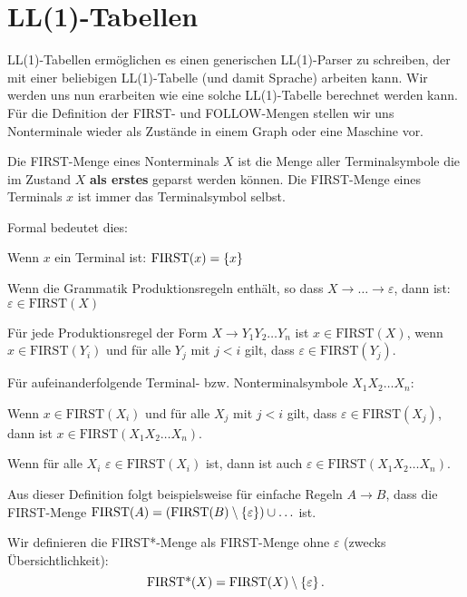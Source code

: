 \section{LL(1)-Tabellen}
LL(1)-Tabellen ermöglichen es einen generischen LL(1)-Parser zu schreiben, der mit
einer beliebigen LL(1)-Tabelle (und damit Sprache) arbeiten kann. Wir werden uns nun erarbeiten wie eine solche LL(1)-Tabelle berechnet werden kann.
Für die Definition der FIRST- und FOLLOW-Mengen stellen wir uns Nonterminale wieder
als Zustände in einem Graph oder eine Maschine vor.
\begin{defn}
Die FIRST-Menge eines Nonterminals $X$ ist die Menge aller Terminalsymbole die im Zustand $X$ \textbf{als erstes} geparst werden können.
Die FIRST-Menge eines Terminals $x$ ist immer das Terminalsymbol selbst.

Formal bedeutet dies:
\begin{\whichenum}
\item Wenn $x$ ein Terminal ist: $\text{FIRST}(x)=\left\{x\right\}$
\item Wenn die Grammatik Produktionsregeln enthält, so dass $X \to \ldots \to \varepsilon$, dann ist: $\varepsilon \in \text{FIRST}(X)$
\item Für jede Produktionsregel der Form $X \to Y_1 Y_2 \ldots Y_n$ ist $x \in \text{FIRST}(X)$, wenn $x \in \text{FIRST}(Y_i)$ und für alle
$Y_j$ mit $j < i$ gilt, dass $\varepsilon \in \text{FIRST}(Y_j)$.
\end{\whichenum}
Für aufeinanderfolgende Terminal- bzw. Nonterminalsymbole $X_1 X_2 \ldots X_n$:
\begin{\whichenum}
\item Wenn $x \in \text{FIRST}(X_i)$ und für alle $X_j$ mit $j < i$ gilt, dass $\varepsilon \in \text{FIRST}(X_j)$,
dann ist $x \in \text{FIRST}(X_1 X_2 \ldots X_n)$.
\item Wenn für alle $X_i$ $\varepsilon \in \text{FIRST}(X_i)$ ist, dann ist auch $\varepsilon \in \text{FIRST}(X_1 X_2 \ldots X_n)$.
\end{\whichenum}
\end{defn}

Aus dieser Definition folgt beispielsweise für einfache Regeln $A \to B$, dass die FIRST-Menge $\text{FIRST}(A) = \left(\text{FIRST}(B) \setminus \left\{\varepsilon\right\}\right)\cup \ldots$ ist.

\begin{defn}
Wir definieren die FIRST*-Menge als FIRST-Menge ohne $\varepsilon$ (zwecks Übersichtlichkeit):
\[\text{FIRST*}(X) = \text{FIRST}(X) \setminus \left\{\varepsilon\right\}.\]
\end{defn}

